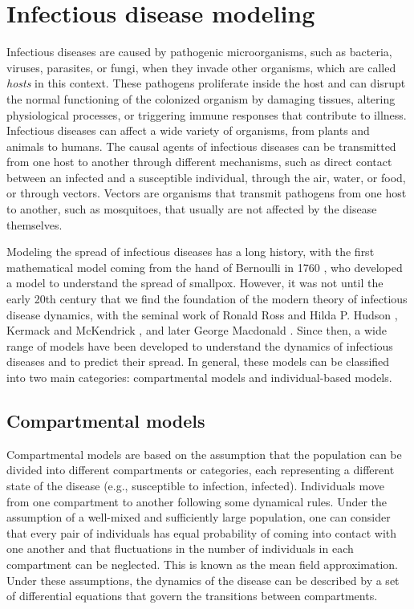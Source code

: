 \section{\label{sec:Infectious disease modelling} Infectious
  disease modeling}

Infectious diseases are caused by pathogenic microorganisms, such as
bacteria, viruses, parasites, or fungi, when they invade other organisms, which
are called \textit{hosts} in this context. These pathogens proliferate inside
the host and can disrupt the normal functioning of the colonized organism by
damaging tissues, altering physiological processes, or triggering immune
responses that contribute to illness. Infectious diseases can affect a wide
variety of organisms, from plants and animals to humans. The causal agents of
infectious diseases can be transmitted from one host to another through
different mechanisms, such as direct contact between an infected and a
susceptible individual, through the air, water, or food, or through vectors.
Vectors are organisms that transmit pathogens from one host to another, such as
mosquitoes, that usually are not affected by the disease themselves.

Modeling the spread of infectious diseases has a long history, with the first
mathematical model coming from the hand of Bernoulli in 1760
\cite{Bernoulli1760}, who developed a model to understand the spread of
smallpox. However, it was not until the early 20th century that we find the
foundation of the modern theory of infectious disease dynamics, with the
seminal work of Ronald Ross and Hilda P. Hudson
\cite{Ross1916,Ross1917,Ross1917_2}, Kermack and McKendrick
\cite{McKendrick}, and later George Macdonald \cite{Macdonald1957}. Since then,
a wide range of models have been developed to understand the dynamics of
infectious diseases and to predict their spread. In general, these models can
be classified into two main categories: compartmental models and
individual-based models.

\subsection{\label{sec:Compartmental models} Compartmental models}

Compartmental models are based on the assumption that the population can be
divided into different compartments or categories, each representing a
different state of the disease (e.g., susceptible to infection, infected).
Individuals move from one compartment to another following some dynamical
rules. Under the assumption of a well-mixed and sufficiently large population,
one can consider that  every pair of individuals has equal probability of
coming into contact with one another and that fluctuations in the number of
individuals in each compartment can be neglected. This is known as the mean
field approximation. Under these assumptions, the dynamics of the disease can
be described by a set of differential equations that govern the transitions
between compartments.

